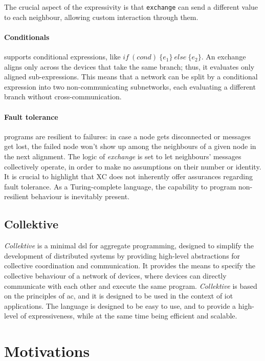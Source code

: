 The crucial aspect of the \xc{} expressivity is that \texttt{exchange} can send a different value to each neighbour,
allowing custom interaction through them.

\paragraph{Conditionals}
\label{par:conditionals}
\xc{} supports conditional expressions, like $if\ (cond)\ \{e_1\}\ else\ \{e_2\}$.
An exchange aligns only across the devices that take the same branch; thus, it evaluates only aligned sub-expressions.
This means that a network can be split by a conditional expression into two non-communicating subnetworks, each
evaluating a different branch without cross-communication.

\paragraph{Fault tolerance}
\xc{} programs are resilient to failures: in case a node gets disconnected or messages get lost, the failed node won't
show up among the neighbours of a given node in the next alignment.
The logic of \emph{exchange} is set to let neighbours' messages collectively operate, in order to make no assumptions
on their number or identity.
It is crucial to highlight that XC does not inherently offer assurances regarding fault tolerance.
As a Turing-complete language, the capability to program non-resilient behaviour is inevitably present.

\subsection{Collektive}
\label{subsec:collektive}
\emph{Collektive} is a minimal \ac{dsl} for aggregate programming, designed to simplify the development of distributed systems
by providing high-level abstractions for collective coordination and communication.
It provides the means to specify the collective behaviour of a network of devices, where devices can directly communicate
with each other and execute the same program.
\emph{Collektive} is based on the principles of \ac{ac}, and it is designed to be used in the context of \ac{iot} applications.
The language is designed to be easy to use, and to provide a high-level of expressiveness, while at the same time being
efficient and scalable.

\section{Motivations}
\label{sec:motivations}

